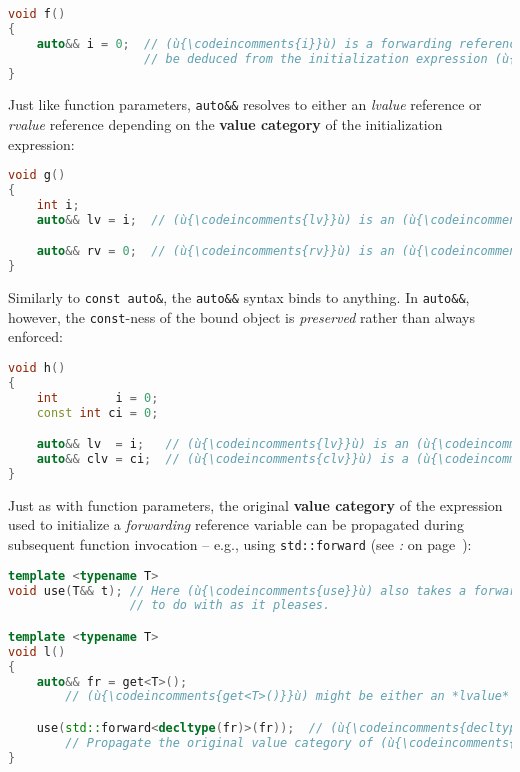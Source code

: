 \begin{lstlisting}[language=C++]
void f()
{
    auto&& i = 0;  // (ù{\codeincomments{i}}ù) is a forwarding reference because the type of (ù{\codeincomments{i}}ù) must
                   // be deduced from the initialization expression (ù{\codeincomments{0}}ù).
}
\end{lstlisting}
    
\noindent Just like function parameters, \texttt{auto\&\&} resolves to either an
\emph{lvalue} reference or \emph{rvalue} reference depending on the
\textbf{value category} of the initialization expression:

\begin{lstlisting}[language=C++]
void g()
{
    int i;
    auto&& lv = i;  // (ù{\codeincomments{lv}}ù) is an (ù{\codeincomments{int\&}}ù).

    auto&& rv = 0;  // (ù{\codeincomments{rv}}ù) is an (ù{\codeincomments{int\&\&}}ù).
}
\end{lstlisting}
    
\noindent Similarly to \texttt{const}~\texttt{auto\&}, the \texttt{auto\&\&}
syntax binds to anything. In \texttt{auto\&\&}, however, the
\texttt{const}-ness of the bound object is \emph{preserved} rather than
always enforced:

\begin{lstlisting}[language=C++]
void h()
{
    int        i = 0;
    const int ci = 0;

    auto&& lv  = i;   // (ù{\codeincomments{lv}}ù) is an (ù{\codeincomments{int\&}}ù).
    auto&& clv = ci;  // (ù{\codeincomments{clv}}ù) is a (ù{\codeincomments{const int\&}}ù).
}
\end{lstlisting}
    
\noindent Just as with function parameters, the original \textbf{value category}
of the expression used to initialize a \emph{forwarding} reference
variable can be propagated during subsequent function invocation --
e.g., using \texttt{std::forward} (see \textit{: } on page~\pageref{the-std::forward-utility}):

\begin{lstlisting}[language=C++]
template <typename T>
void use(T&& t); // Here (ù{\codeincomments{use}}ù) also takes a forwarding reference parameter
                 // to do with as it pleases.

template <typename T>
void l()
{
    auto&& fr = get<T>();
        // (ù{\codeincomments{get<T>()}}ù) might be either an *lvalue* or *rvalue* depending on (ù{\codeincomments{T}}ù).

    use(std::forward<decltype(fr)>(fr));  // (ù{\codeincomments{decltype}}ù) is a C++11 feature.
        // Propagate the original value category of (ù{\codeincomments{get<T>()}}ù) into (ù{\codeincomments{use}}ù).
}
\end{lstlisting}
    
